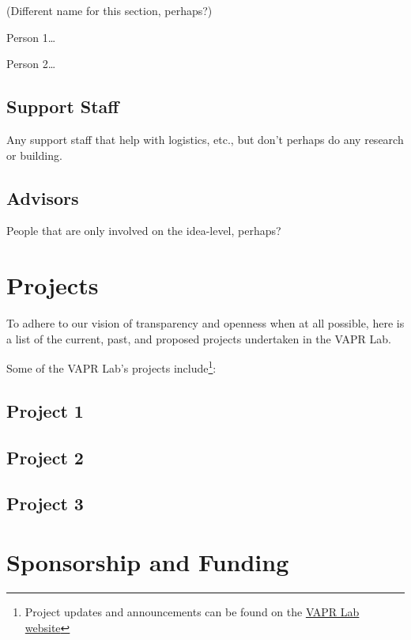 \documentclass[
  12pt,
]{memoir}
\begin{document}
(Different name for this section, perhaps?)

Person 1\ldots{}

Person 2\ldots{}

\hypertarget{support-staff}{%
\section{Support Staff}\label{support-staff}}

Any support staff that help with logistics, etc., but don't perhaps do any research or building.

\hypertarget{advisors}{%
\section{Advisors}\label{advisors}}

People that are only involved on the idea-level, perhaps?

\hypertarget{projects}{%
\chapter{Projects}\label{projects}}

To adhere to our vision of transparency and openness when at all possible, here is a list of the current, past, and proposed projects undertaken in the VAPR Lab.

Some of the VAPR Lab's projects include\footnote{Project updates and announcements can be found on the \href{https://VAPR-Lab.github.io/website/}{VAPR Lab website}}:

\hypertarget{project-1}{%
\section{Project 1}\label{project-1}}

\hypertarget{project-2}{%
\section{Project 2}\label{project-2}}

\hypertarget{project-3}{%
\section{Project 3}\label{project-3}}

\hypertarget{funding}{%
\chapter{Sponsorship and Funding}\label{funding}}
\end{document}
